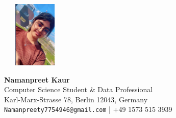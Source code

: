 \documentclass[11pt,a4paper]{article}
\begin{document}
\noindent
\begin{minipage}[c]{0.23\textwidth}
    \includegraphics[width=3.2cm, height=3.2cm, keepaspectratio]{image.jpg}
\end{minipage}
\hfill
\begin{minipage}[c]{0.72\textwidth}
    \textcolor{primary}{\Huge \textbf{Namanpreet Kaur}}\\[3pt]
    \textcolor{secondary}{\large Computer Science Student \& Data Professional}\\[6pt]
    Karl-Marx-Strasse 78, Berlin 12043, Germany \\
    \texttt{Namanpreety7754946@gmail.com} \quad | \quad +49 1573 515 3939
\end{minipage}

\vspace{6pt}
\end{document}
